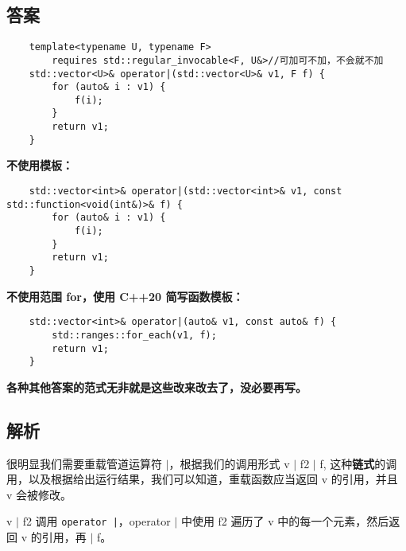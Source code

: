 

\subsection{答案}

\begin{verbatim}
    template<typename U, typename F>
        requires std::regular_invocable<F, U&>//可加可不加，不会就不加
    std::vector<U>& operator|(std::vector<U>& v1, F f) {
        for (auto& i : v1) {
            f(i);
        }
        return v1;
    }
\end{verbatim}

\textbf{不使用模板：}

\begin{verbatim}
    std::vector<int>& operator|(std::vector<int>& v1, const std::function<void(int&)>& f) {
        for (auto& i : v1) {
            f(i);
        }
        return v1;
    }
\end{verbatim}

\textbf{不使用范围 for，使用 C++20 简写函数模板：}

\begin{verbatim}
    std::vector<int>& operator|(auto& v1, const auto& f) {
        std::ranges::for_each(v1, f);
        return v1;
    }
\end{verbatim}

\textbf{各种其他答案的范式无非就是这些改来改去了，没必要再写。}

\subsection{解析}

很明显我们需要重载管道运算符 $|$，根据我们的调用形式 v $|$ f2 $|$ f,
这种\textbf{链式}的调用，以及根据给出运行结果，我们可以知道，重载函数应当返回 v 的引用，并且 v 会被修改。

v $|$ f2 调用 \texttt{operator |}，operator $|$ 中使用 f2 遍历了 v 中的每一个元素，然后返回 v 的引用，再 $|$ f。